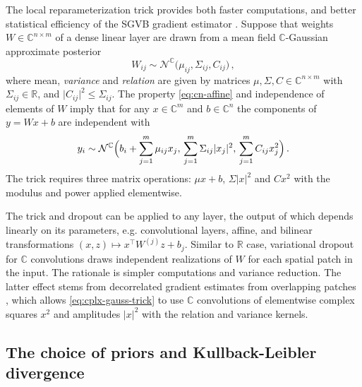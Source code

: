 \documentclass[a4paper,10pt]{article}
\newcommand{\real}{\mathbb{R}}
\newcommand{\cplx}{\mathbb{C}}
\begin{document}
The local reparameterization trick provides both faster computations, and better statistical
efficiency of the SGVB gradient estimator \citep{wang_fast_2013,kingma_variational_2015}.
Suppose that weights $W \in \cplx^{n\times m}$ of a dense linear layer are drawn from a
mean field $\cplx$-Gaussian approximate posterior
\begin{equation}  \label{eq:c-gauss-vi-general}
  W_{ij}
    \sim \mathcal{N}^{\cplx} \bigl(
      \mu_{ij}, \Sigma_{ij}, C_{ij}
    \bigr)
  \,,
\end{equation}
where mean, \textit{variance} and \textit{relation} are given by matrices $
  \mu, \Sigma, C \in \cplx^{n\times m}
$ with $\Sigma_{ij} \in \real$, and $
  \lvert C_{ij} \rvert^2 \leq \Sigma_{ij}
$. The property \eqref{eq:cn-affine} and independence of elements of $W$ imply that for any
$x \in \cplx^m$ and $b \in \cplx^n$ the components of $y = W x + b$ are independent with
\begin{equation}  \label{eq:cplx-gauss-trick}
  y_i
    \sim \mathcal{N}^{\cplx}
      \Bigl(
        b_i + \sum_{j=1}^m \mu_{ij} x_j,
        \, \sum_{j=1}^m \Sigma_{ij} \lvert x_j \rvert^2,
        \, \sum_{j=1}^m C_{ij} x_j^2
      \Bigr)
    \,.
\end{equation}
The trick requires three matrix operations: $\mu x + b$, $\Sigma \lvert x \rvert^2$ and
$C x^2$ with the modulus and power applied elementwise.

The trick and dropout can be applied to any layer, the output of which depends linearly
on its parameters, e.g. convolutional layers, affine, and bilinear transformations $
  (x, z) \mapsto x^\top W^{(j)} z + b_j
$. Similar to $\real$ case, variational dropout for $\cplx$ convolutions draws independent
realizations of $W$ for each spatial patch in the input. The rationale is simpler computations
and variance reduction. The latter effect stems from decorrelated gradient estimates from
overlapping patches \citep{kingma_variational_2015}, which allows \eqref{eq:cplx-gauss-trick}
to use $\cplx$ convolutions of elementwise complex squares $x^2$ and amplitudes $\lvert x \rvert^2$
with the relation and variance kernels.


\subsection{The choice of priors and Kullback-Leibler divergence} %
\label{sub:priors_and_kullback_leibler_divergence}
\end{document}
